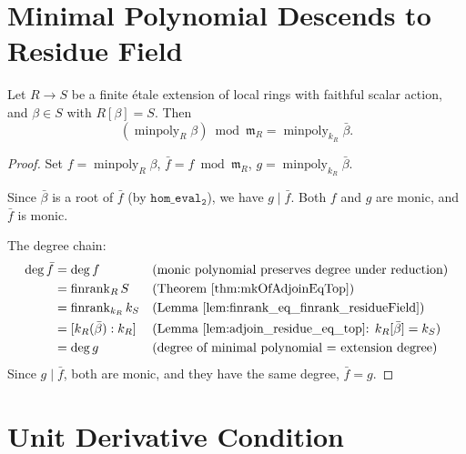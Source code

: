 \section{Minimal Polynomial Descends to Residue Field}

\begin{lemma}
  \label{lem:minpoly_map_residue}
  \leanok
  Let $R \to S$ be a finite étale extension of local rings with faithful
  scalar action, and $\beta \in S$ with $R[\beta] = S$.
  Then
  \[
    (\operatorname{minpoly}_R \beta) \bmod \mathfrak{m}_R
    = \operatorname{minpoly}_{k_R} \bar\beta.
  \]
\end{lemma}

\begin{proof}
  \leanok
  Set $f = \operatorname{minpoly}_R \beta$, $\bar f = f \bmod \mathfrak{m}_R$,
  $g = \operatorname{minpoly}_{k_R} \bar\beta$.

  Since $\bar\beta$ is a root of $\bar f$ (by $\mathtt{hom\_eval_2}$),
  we have $g \mid \bar f$.
  Both $f$ and $g$ are monic, and $\bar f$ is monic.

  The degree chain:
  \begin{align*}
    \deg \bar f &= \deg f
      && \text{(monic polynomial preserves degree under reduction)} \\
    &= \operatorname{finrank}_R S
      && \text{(Theorem~\ref{thm:mkOfAdjoinEqTop})} \\
    &= \operatorname{finrank}_{k_R} k_S
      && \text{(Lemma~\ref{lem:finrank_eq_finrank_residueField})} \\
    &= [k_R(\bar\beta) : k_R]
      && \text{(Lemma~\ref{lem:adjoin_residue_eq_top}: } k_R[\bar\beta] = k_S \text{)} \\
    &= \deg g
      && \text{(degree of minimal polynomial = extension degree)}
  \end{align*}
  Since $g \mid \bar f$, both are monic, and they have the same degree,
  $\bar f = g$.
\end{proof}

\section{Unit Derivative Condition}

